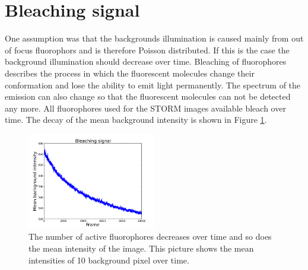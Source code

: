 \section{Bleaching signal}
One assumption was that the backgrounds illumination is caused mainly from out of focus fluorophors and is therefore Poisson distributed. If this is the case the background illumination should decrease over time. Bleaching of fluorophores describes the process in which the fluorescent molecules change their conformation and lose the ability to emit light permanently. The spectrum of the emission can also change so that the fluorescent molecules can not be detected any more. All fluorophores used for the STORM images available bleach over time. The decay of the mean background intensity is shown in Figure \ref{bleaching}.

\begin{figure}
\centering
\includegraphics[width = 0.5\textwidth]{pictures/bleaching.png}
	\caption{The number of active fluorophores decreases over time and so does the mean intensity of the image. This picture shows the mean intensities of 10 background pixel over time. }
	\label{bleaching}
\end{figure}


